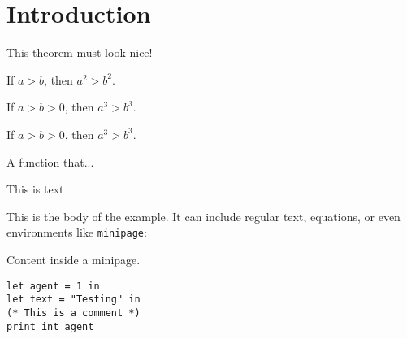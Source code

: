 \newpage
\chapter{Introduction}
\label{Introduction}

\begin{theorem}
	This theorem must look nice!
\end{theorem}
\begin{theorem}
If \(a > b\), then \(a^2 > b^2\).
\end{theorem}

\begin{corollary}
If \(a > b > 0\), then \(a^3 > b^3\).
\end{corollary}

\begin{proposition}
If \(a > b > 0\), then \(a^3 > b^3\).
\end{proposition}

\begin{definition}
A function that...
\end{definition}


\begin{example}
	
	This is text 

\end{example}
\begin{example}
This is the body of the example. It can include regular text, equations, or even environments like \texttt{minipage}:
\begin{minipage}{0.5\textwidth}
Content inside a minipage.
\end{minipage}
\end{example}



\begin{lstlisting}[language=caml]
let agent = 1 in
let text = "Testing" in
(* This is a comment *)
print_int agent
\end{lstlisting}

